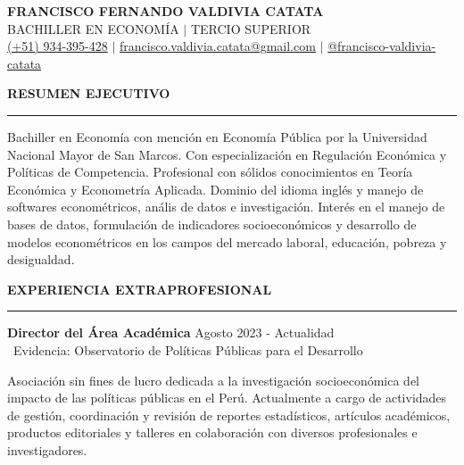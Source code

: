 \documentclass{resume}
\begin{document}
\begin{center}
	\MakeUppercase{\LARGE \bf Francisco Fernando Valdivia Catata}
	\vspace{2mm} \\
	\MakeUppercase{Bachiller en Economía $|$ Tercio Superior}
	\vspace{2mm} \\
	{\color{vino}\faPhoneSquare} {\href{tel:934395428}{(+51) 934-395-428}} $|$
	{\color{vino}\faEnvelopeSquare} {\href{mailto:francisco.valdivia.catata@gmail.com}{francisco.valdivia.catata@gmail.com}} $|$
	{\color{vino}\faLinkedinSquare} {\href{https://www.linkedin.com/in/francisco-valdivia-catata/}{@francisco-valdivia-catata}}
	\vspace{2mm}
\end{center}


{\color{vino} \noindent\MakeUppercase{\large \bf Resumen Ejecutivo} \\
\rule[3mm]{\textwidth}{0.5mm}}

\noindent Bachiller en Economía con mención en Economía Pública por la Universidad Nacional Mayor de San Marcos.
Con especialización en Regulación Económica y Políticas de Competencia.
Profesional con sólidos conocimientos en Teoría Económica y Econometría Aplicada.
Dominio del idioma inglés y manejo de softwares econométricos, anális de datos e investigación.
Interés en el manejo de bases de datos, formulación de indicadores socioeconómicos y desarrollo de modelos econométricos
en los campos del mercado laboral, educación, pobreza y desigualdad.

\vspace{5mm}


{\color{vino} \noindent\MakeUppercase{\large \bf Experiencia Extraprofesional} \\
\rule[3mm]{\textwidth}{0.5mm}}

\noindent {\color{vino} \faBriefcase} \; {\bf Director del Área Académica} \hfill
{\color{vino}\faCalendarCheckO} {Agosto 2023 - Actualidad} \\
{\color{vino}\faInstitution} \, {Evidencia: Observatorio de Políticas Públicas para el Desarrollo}

\vspace{2mm}

\noindent Asociación sin fines de lucro dedicada a la investigación socioeconómica del impacto de las políticas públicas en el Perú.
Actualmente a cargo de actividades de gestión, coordinación y revisión de reportes estadísticos,
artículos académicos, productos editoriales y talleres en colaboración con diversos profesionales e investigadores.
\end{document}
